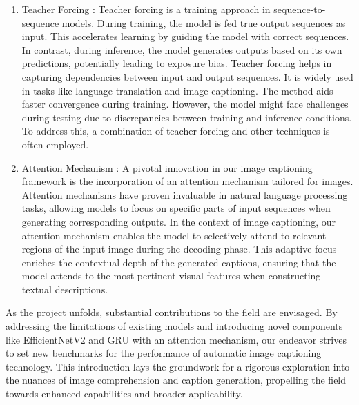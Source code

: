 \documentclass[oneside,a4paper,12pt]{report}
\begin{document}
\begin{enumerate}
\item{Teacher Forcing : }
Teacher forcing is a training approach in sequence-to-sequence models. During training, the model is fed true output sequences as input. This accelerates learning by guiding the model with correct sequences. In contrast, during inference, the model generates outputs based on its own predictions, potentially leading to exposure bias. Teacher forcing helps in capturing dependencies between input and output sequences. It is widely used in tasks like language translation and image captioning. The method aids faster convergence during training. However, the model might face challenges during testing due to discrepancies between training and inference conditions. To address this, a combination of teacher forcing and other techniques is often employed.



\item {Attention Mechanism : }
A pivotal innovation in our image captioning framework is the incorporation of an attention mechanism tailored for images. Attention mechanisms have proven invaluable in natural language processing tasks, allowing models to focus on specific parts of input sequences when generating corresponding outputs. In the context of image captioning, our attention mechanism enables the model to selectively attend to relevant regions of the input image during the decoding phase. This adaptive focus enriches the contextual depth of the generated captions, ensuring that the model attends to the most pertinent visual features when constructing textual descriptions.

\end{enumerate}
As the project unfolds, substantial contributions to the field are envisaged. By addressing the limitations of existing models and introducing novel components like EfficientNetV2 and GRU with an attention mechanism, our endeavor strives to set new benchmarks for the performance of automatic image captioning technology. This introduction lays the groundwork for a rigorous exploration into the nuances of image comprehension and caption generation, propelling the field towards enhanced capabilities and broader applicability.
\newpage
\end{document}
